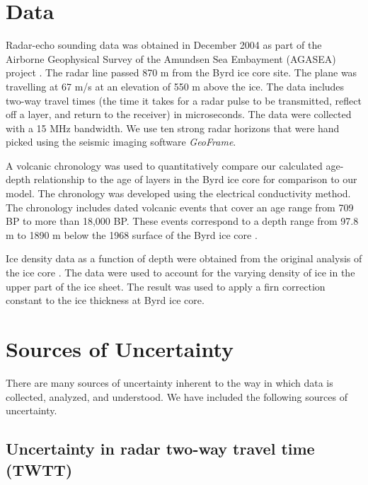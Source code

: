 \documentclass[draft,jgrga]{agutex}
\begin{document}
\begin{article}
\section{Data}

Radar-echo sounding data was obtained in December 2004 as part of the Airborne Geophysical Survey of the Amundsen Sea Embayment (AGASEA) project \citep{holt2006}. The radar line passed 870 m from the Byrd ice core site. The plane was travelling at 67 m/s at an elevation of 550 m above the ice. The data includes two-way travel times (the time it takes for a radar pulse to be transmitted, reflect off a layer, and return to the receiver) in microseconds. The data were collected with a 15 MHz bandwidth. We use ten strong radar horizons that were hand picked using the seismic imaging software \textit{GeoFrame}.

A volcanic chronology was used to quantitatively compare our calculated age-depth relationship to the age of layers in the Byrd ice core \citep{hammer1994} for comparison to our model. The chronology was developed using the electrical conductivity method. The chronology includes dated volcanic events that cover an age range from 709 BP to more than 18,000 BP. These events correspond to a depth range from 97.8 m to 1890 m below the 1968 surface of the Byrd ice core \citep{gow1968}.

Ice density data as a function of depth were obtained from the original analysis of the ice core \citep{gow1968}. The data were used to account for the varying density of ice in the upper part of the ice sheet. The result was used to apply a firn correction constant to the ice thickness at Byrd ice core. 





\section{Sources of Uncertainty}\label{unc}
There are many sources of uncertainty inherent to the way in which
data is collected, analyzed, and understood. We have included the
following sources of uncertainty.

\subsection{Uncertainty in radar two-way travel time (TWTT)}


\end{article}
\end{document}
